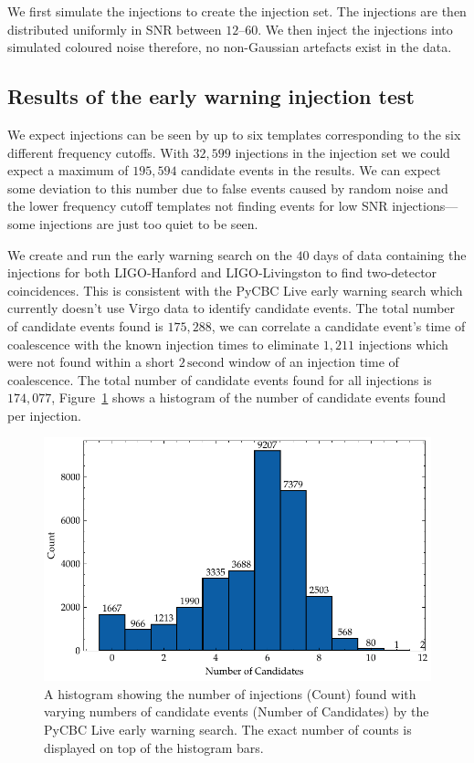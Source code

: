 We first simulate the injections to create the injection set. The injections are then distributed uniformly in SNR between $12\text{--}60$. We then inject the injections into simulated coloured noise therefore, no non-Gaussian artefacts exist in the data.

\subsection{\label{6:sec:results}Results of the early warning injection test}

We expect injections can be seen by up to six templates corresponding to the six different frequency cutoffs. With $32,599$ injections in the injection set we could expect a maximum of $195,594$ candidate events in the results. We can expect some deviation to this number due to false events caused by random noise and the lower frequency cutoff templates not finding events for low SNR injections---some injections are just too quiet to be seen.

We create and run the early warning search on the $40$ days of data containing the injections for both LIGO-Hanford and LIGO-Livingston to find two-detector coincidences. This is consistent with the PyCBC Live early warning search which currently doesn't use Virgo data to identify candidate events. The total number of candidate events found is $175,288$, we can correlate a candidate event's time of coalescence with the known injection times to eliminate $1,211$ injections which were not found within a short $2 \, \text{second}$ window of an injection time of coalescence. The total number of candidate events found for all injections is $174,077$, Figure~\ref{6:fig:cand_hist} shows a histogram of the number of candidate events found per injection.
%
\begin{figure}
    \centering
    \includegraphics[width=1.0\textwidth]{images/6_earlywarning/results/count_histogram.pdf}
    \caption{A histogram showing the number of injections (Count) found with varying numbers of candidate events (Number of Candidates) by the PyCBC Live early warning search. The exact number of counts is displayed on top of the histogram bars.}
    \label{6:fig:cand_hist}
\end{figure}
%

